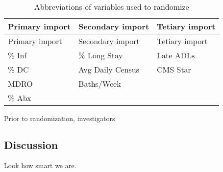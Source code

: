 \documentclass[]{sagej}
\begin{document}
\begin{longtable}[]{@{}lll@{}}
\caption{Abbreviations of variables used to randomize}\tabularnewline
\toprule
Primary import & Secondary import & Tetiary import\tabularnewline
\midrule
\endfirsthead
\toprule
Primary import & Secondary import & Tetiary import\tabularnewline
\midrule
\endhead
\% Inf & \% Long Stay & Late ADLs\tabularnewline
\% DC & Avg Daily Census & CMS Star\tabularnewline
MDRO & Baths/Week\tabularnewline
\% Abx &\tabularnewline
\bottomrule
\end{longtable}

Prior to randomization, investigators

\subsection{Discussion}\label{discussion}

Look how smart we are.


\end{document}
